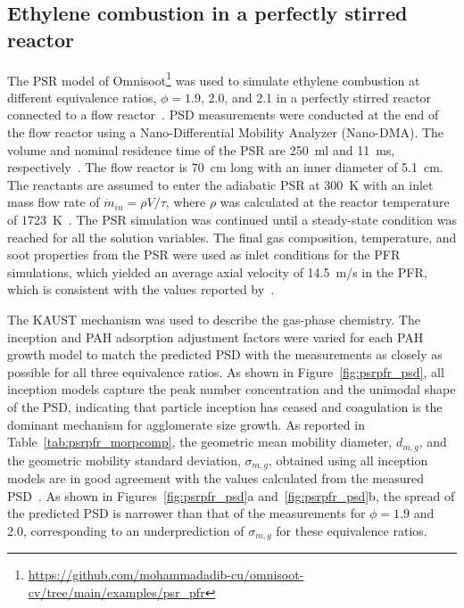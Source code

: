 \subsection{Ethylene combustion in a perfectly stirred reactor}
The PSR model of Omnisoot\footnote{\href{https://github.com/mohammadadib-cu/omnisoot-cv/tree/main/examples/psr_pfr}{https://github.com/mohammadadib-cu/omnisoot-cv/tree/main/examples/psr\_pfr}} was used to simulate ethylene combustion at different equivalence ratios, $\phi = 1.9$, 2.0, and 2.1 in a perfectly stirred reactor connected to a flow reactor~\citep{manzello2007soot}. PSD measurements were conducted at the end of the flow reactor using a Nano-Differential Mobility Analyzer (Nano-DMA). The volume and nominal residence time of the PSR are 250~ml and 11~ms, respectively~\citep{manzello2007soot}. The flow reactor is 70~cm long with an inner diameter of 5.1~cm. The reactants are assumed to enter the adiabatic PSR at 300~K with an inlet mass flow rate of $\dot{m}_{in} = \rho V / \tau$, where $\rho$ was calculated at the reactor temperature of 1723~K~\citep{lenhert2009effects}. The PSR simulation was continued until a steady-state condition was reached for all the solution variables. The final gas composition, temperature, and soot properties from the PSR were used as inlet conditions for the PFR simulations, which yielded an average axial velocity of 14.5~m/s in the PFR, which is consistent with the values reported by~\citet{manzello2007soot}.

The KAUST mechanism was used to describe the gas-phase chemistry. The inception and PAH adsorption adjustment factors were varied for each PAH growth model to match the predicted PSD with the measurements as closely as possible for all three equivalence ratios. As shown in Figure~\ref{fig:psrpfr_psd}, all inception models capture the peak number concentration and the unimodal shape of the PSD, indicating that particle inception has ceased and coagulation is the dominant mechanism for agglomerate size growth. As reported in Table~\ref{tab:psrpfr_morpcomp}, the geometric mean mobility diameter, $d_{m,g}$, and the geometric mobility standard deviation, $\sigma_{m,g}$, obtained using all inception models are in good agreement with the values calculated from the measured PSD~\citep{manzello2007soot}. As shown in Figures~\ref{fig:psrpfr_psd}a and~\ref{fig:psrpfr_psd}b, the spread of the predicted PSD is narrower than that of the measurements for $\phi = 1.9$ and 2.0, corresponding to an underprediction of $\sigma_{m,g}$ for these equivalence ratios.



